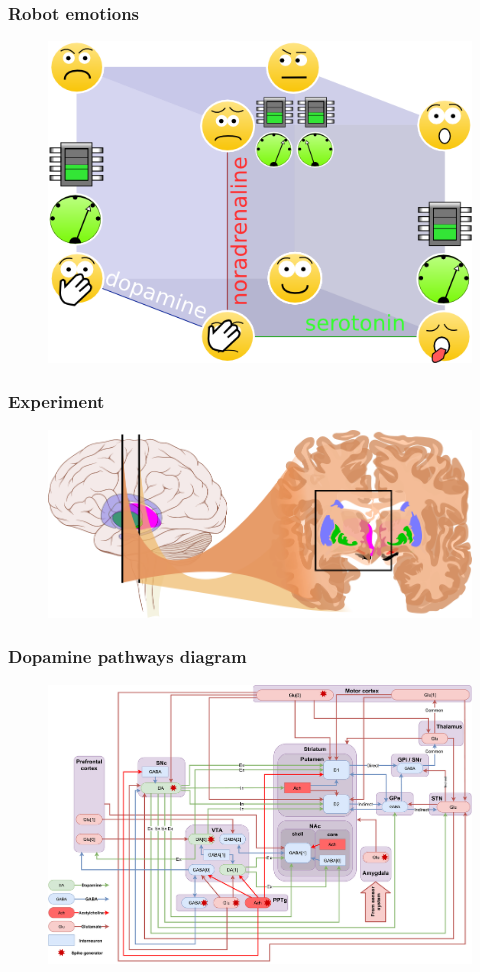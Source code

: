 \documentclass[12pt, aspectratio=169]{beamer}
\begin{document}
\begin{frame}
\frametitle{Robot emotions}
\begin{figure}
\includegraphics[width=0.7\linewidth]{cube_of_emotional_parameters_machine}
\end{figure}
\end{frame}

\begin{frame}
\frametitle{Experiment}
\begin{figure}
\includegraphics[width=0.99\linewidth]{Basal_ganglia_circuits_cropped}
\end{figure}
\end{frame}


\begin{frame}
\frametitle{Dopamine pathways diagram}
\begin{figure}
\includegraphics[width=0.8\linewidth]{dopamine_diagram}
\end{figure}
\end{frame}
\end{document}
